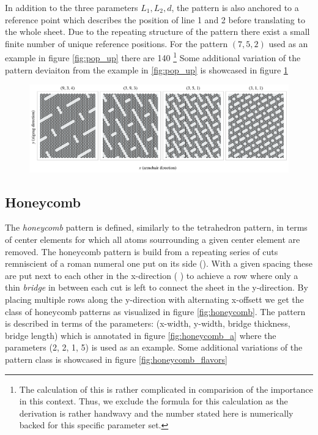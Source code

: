 In addition to the three parameters $L_1, L_2, d$, the pattern is also anchored to a reference point which describes the position of line 1 and 2 before translating to the whole sheet. Due to the repeating structure of the pattern there exist a small finite number of unique reference positions. For the pattern $(7, 5, 2)$ used as an example in figure \ref{fig:pop_up} there are 140 \footnote{The calculation of this is rather complicated in comparision of the importance in this context. Thus, we exclude the formula for this calculation as the derivation is rather handwavy and the number stated here is numerically backed for this specific parameter set.} Some additional variation of the pattern deviaiton from the example in \ref{fig:pop_up} is showcased in figure \ref{fig:pop_up_flavors}

\begin{figure}[H]
  \centering
  \includegraphics[width=\linewidth]{figures/system/pop_up_flavors.pdf}
  \caption{}
  \label{fig:pop_up_flavors}
\end{figure}



\subsection{Honeycomb}
The \textit{honeycomb} pattern is defined, similarly to the tetrahedron pattern,
in terms of center elements for which all atoms sourrounding a given center
element are removed. The honeycomb pattern is build from a repeating series of
cuts remniscient of a roman numeral one put on its side
(). With a given spacing these are put next to each other in the x-direction (
) to achieve a row
where only a thin \textit{bridge} in between each cut is left to connect the sheet in the y-direction. By placing multiple rows along the y-direction with alternating x-offsett we get the class of honeycomb patterns as visualized in figure \ref{fig:honeycomb}. The pattern
is described in terms of the parameters: (x-width, y-width, bridge thickness,
bridge length) which is annotated in figure \ref{fig:honeycomb_a} where the parameters (2, 2, 1, 5) is used as an example. Some additional variations of the pattern class is showcased in figure \ref{fig:honeycomb_flavors}


